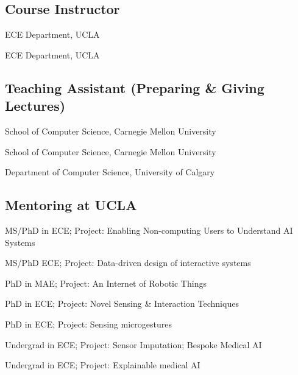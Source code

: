\subsection{Course Instructor}

 {
	 {
		ECE Department, UCLA
	}
}

 {
	 {
		ECE Department, UCLA
	}
}

\subsection{Teaching Assistant (Preparing \& Giving Lectures)}

 {
	 {
		School of Computer Science, Carnegie Mellon University
	}
}

 {
	 {
		School of Computer Science, Carnegie Mellon University
	}
}

 {
	 {
		Department of Computer Science, University of Calgary
	}
}

\subsection{Mentoring at UCLA}
 {
	 {
		MS/PhD in ECE; Project: Enabling Non-computing Users to Understand AI Systems
	}
}

 {
	 {
		MS/PhD ECE; Project: Data-driven design of interactive systems
	}
}

 {
	 {
		PhD in MAE; Project: An Internet of Robotic Things
	}
}

 {
	 {
		PhD in ECE; Project: Novel Sensing \& Interaction Techniques
	}
}

 {
	 {
		PhD in ECE; Project: Sensing microgestures
	}
}

 {
	 {
		Undergrad in ECE; Project: Sensor Imputation; Bespoke Medical AI
	}
}

 {
	 {
		Undergrad in ECE; Project: Explainable medical AI
	}
}


